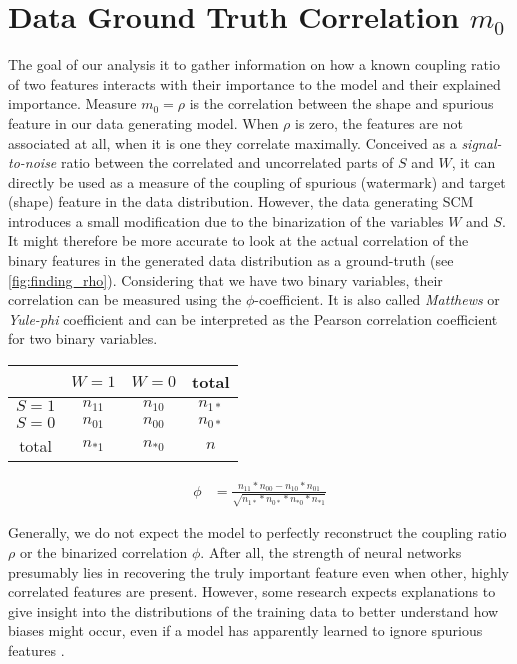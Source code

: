 \section{Data Ground Truth Correlation $m_0$}
The goal of our analysis it to gather information on how a known coupling ratio of two features interacts with their importance to the model and their explained importance. 
Measure $m_0 = \rho$ is the correlation between the shape and spurious feature in our data generating model. When $\rho$ is zero, the features are not associated at all, when it is one they correlate maximally. Conceived as a \textit{signal-to-noise} ratio between the correlated and uncorrelated parts of $S$ and $W$, it can directly be used as a measure of the coupling of spurious (watermark) and target (shape) feature in the data distribution. However, the data generating SCM introduces a small modification due to the binarization of the variables $W$ and $S$. It might therefore be more accurate to look at the actual correlation of the binary features in the generated data distribution as a ground-truth (see \cref{fig:finding_rho}). Considering that we have two binary variables, their correlation can be measured using the $\phi$-coefficient. It is also called \textit{Matthews} or \textit{Yule-phi} coefficient and can be interpreted as the Pearson correlation coefficient for two binary variables. 

\vspace{1em}
\begin{minipage}[t]{0.5\textwidth}
\begin{tabular}{|c|c|c|c|}
    \hline
     & $W= 1$ & $W = 0$ & total  \\  \hline
    $S= 1$ & $n_{11}$ & $n_{10}$ & $n_{1*}$ \\ \hline
    $S= 0$ & $n_{01}$ & $n_{00}$ & $n_{0*}$ \\ \hline
    total& $n_{*1}$ & $n_{*0}$ & $n$ \\ \hline
\end{tabular}
\end{minipage}%
\begin{minipage}[c]{0.45\textwidth}
\begin{align}
\phi & = \frac{n_{11} * n_{00} - n_{10}*n_{01}}{\sqrt{n_{1*}*n_{0*}*n_{*0}*n_{*1}}} \label{eq:phi_coefficient} 
\end{align}
\end{minipage}
\vspace{1em}

Generally, we do not expect the model to perfectly reconstruct the coupling ratio $\rho$ or the binarized correlation $\phi$. After all, the strength of neural networks presumably lies in recovering the truly important feature even when other, highly correlated features are present. However, some research expects explanations to give insight into the distributions of the training data to better understand how biases might occur, even if a model has apparently learned to ignore spurious features \citep{Kindermans2017}. 

